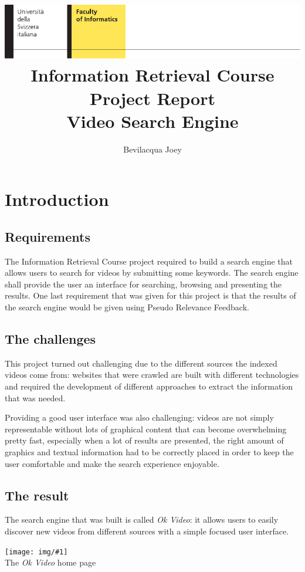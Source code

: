 \documentclass[12pt,numbers=enddot]{exam}
\title{
{\protect\includegraphics[width=\textwidth]{logo-info.pdf}}
\protect\textbf{Information Retrieval Course Project Report}\\
\protect Video Search Engine
}
\author{Bevilacqua Joey}
\newcommand{\pic}[2]{{
\begin{center}
\texttt{[image: img/\#1]} \\
{#2}
\end{center}
}}
\begin{document}
\maketitle

\tableofcontents

\newpage

\section{Introduction}

\subsection{Requirements}

The Information Retrieval Course project required to build a search engine
that allows users to search for videos by submitting some keywords. 
The search engine shall provide the user an interface for searching, browsing
and presenting the results. One last requirement that was given for this
project is that the results of the search engine would be given using
Pseudo Relevance Feedback.

\subsection{The challenges}

This project turned out challenging due to the different sources the
indexed videos come from: websites that were crawled are built with different
technologies and required the development of different approaches to extract
the information that was needed.

Providing a good user interface was also challenging: videos are not simply
representable without lots of graphical content that can become overwhelming
pretty fast, especially when a lot of results are presented, the right amount
of graphics and textual information had to be correctly placed in order to
keep the user comfortable and make the search experience enjoyable.

\subsection{The result}

The search engine that was built is called \textit{Ok Video}: it allows
users to easily discover new videos from different sources with a simple
focused user interface.

\pic{se_home}{The \textit{Ok Video} home page}
\end{document}
